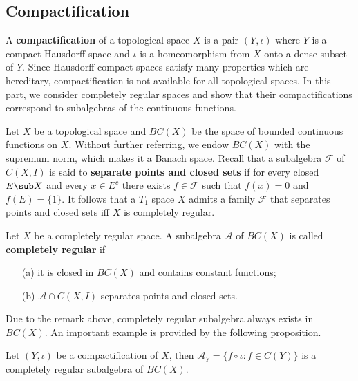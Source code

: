 \subsection{Compactification}
A \textbf{compactification} of a topological space $X$ is a pair $(Y,\iota)$ where $Y$ is a compact Hausdorff space and $\iota$ is a homeomorphism from $X$ onto a dense subset of $Y$. Since Hausdorff compact spaces satisfy many properties which are hereditary, compactification is not available for all topological spaces. In this part, we consider completely regular spaces and show that their compactifications correspond to subalgebras of the continuous functions.\par
Let $X$ be a topological space and $BC(X)$ be the space of bounded continuous functions on $X$. Without further referring, we endow $BC(X)$ with the supremum norm, which makes it a Banach space. Recall that a subalgebra $\mathcal{F}$ of $C(X,I)$ is said to \textbf{separate points and closed sets} if for every closed $E\sub X$ and every $x\in E^c$ there exists $f\in\mathcal{F}$ such that $f(x)=0$ and $f(E)=\{1\}$. It follows that a $T_1$ space $X$ admits a family $\mathcal{F}$ that separates points and closed sets iff $X$ is completely regular.\par
Let $X$ be a completely regular space. A subalgebra $\mathcal{A}$ of $BC(X)$ is called \textbf{completely regular} if
\begin{itemize}
\item[(a)] it is closed in $BC(X)$ and contains constant functions;
\item[(b)] $\mathcal{A}\cap C(X,I)$ separates points and closed sets.
\end{itemize}
Due to the remark above, completely regular subalgebra always exists in $BC(X)$. An important example is provided by the following proposition.
\begin{proposition}\label{compactification induced algebra is completely regular}
Let $(Y,\iota)$ be a compactification of $X$, then $\mathcal{A}_Y=\{f\circ\iota:f\in C(Y)\}$ is a completely regular subalgebra of $BC(X)$.
\end{proposition}
